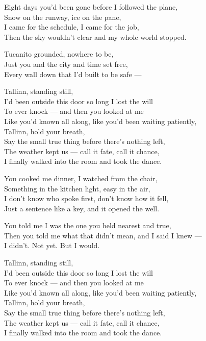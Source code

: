 \begin{lyrics}
Eight days you'd been gone before I followed the plane,\\
Snow on the runway, ice on the pane,\\
I came for the schedule, I came for the job,\\
Then the sky wouldn't clear and my whole world stopped.

Tucanito grounded, nowhere to be,\\
Just you and the city and time set free,\\
Every wall down that I'd built to be safe —

Tallinn, standing still,\\
I'd been outside this door so long I lost the will\\
To ever knock — and then you looked at me\\
Like you'd known all along, like you'd been waiting patiently,\\
Tallinn, hold your breath,\\
Say the small true thing before there's nothing left,\\
The weather kept us — call it fate, call it chance,\\
I finally walked into the room and took the dance.

You cooked me dinner, I watched from the chair,\\
Something in the kitchen light, easy in the air,\\
I don't know who spoke first, don't know how it fell,\\
Just a sentence like a key, and it opened the well.

You told me I was the one you held nearest and true,\\
Then you told me what that didn't mean, and I said I knew —\\
I didn't. Not yet. But I would.

Tallinn, standing still,\\
I'd been outside this door so long I lost the will\\
To ever knock — and then you looked at me\\
Like you'd known all along, like you'd been waiting patiently,\\
Tallinn, hold your breath,\\
Say the small true thing before there's nothing left,\\
The weather kept us — call it fate, call it chance,\\
I finally walked into the room and took the dance.


\end{lyrics}
